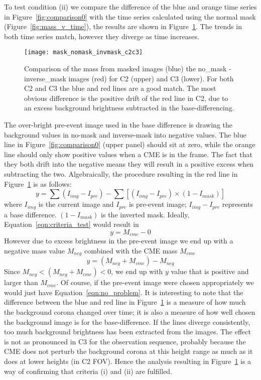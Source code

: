 To test condition (ii) we compare the difference of the blue and orange time series in Figure~\ref{fig:comparison0} with the time series calculated using the normal mask (Figure~\ref{fig:mass_v_time}), the results are shown in Figure~\ref{fig:comparison}. The trends in both time series match, however they diverge as time increases. 
\begin{figure}[t!]
\begin{center}
\texttt{[image: mask\_nomask\_invmask\_c2c3]}
\caption[Mass time series error check]{Comparison of the mass from masked images (blue) the no\_mask - inverse\_mask images (red) for C2 (upper) and C3 (lower). For both C2 and C3 the blue and red lines are a good match. The most obvious difference is the positive drift of the red line in C2, due to an excess background brightness subtracted in the base-differencing.}
\label{fig:comparison}
\end{center}
\end{figure}
The over-bright pre-event image used in the base difference is drawing the background values in no-mask and inverse-mask into negative values. The blue line in Figure~\ref{fig:comparison0} (upper panel) should sit at zero, while the orange line should only show positive values when a CME is in the frame. The fact that they both drift into the negative means they will result in a positive excess when subtracting the two.
Algebraically, the procedure resulting in the red line in Figure~\ref{fig:comparison} is as follows:
\begin{equation}
y = \sum(I_{img} - I_{pre}) - \sum[(I_{img} - I_{pre})\times (1-I_{mask})]
\label{eqn:criteria_test}
\end{equation}
where $I_{img}$ is the current image and $I_{pre}$ is pre-event image; $I_{img} - I_{pre}$ represents a base difference. $(1-I_{mask})$ is the inverted mask. Ideally, Equation~\ref{eqn:criteria_test} would result in
\begin{equation}
y = M_{cme} - 0
\label{eqn:no_problem}
\end{equation}
However due to excess brightness in the pre-event image we end up with a negative mass value $M_{neg}$ combined with the CME mass $M_{cme}$
\begin{equation}
y = (M_{neg} + M_{cme})  - M_{neg}
\end{equation}
Since $M_{neg} < (M_{neg} + M_{cme}   ) < 0$, we end up with $y$ value that is positive and larger than $M_{cme}$. Of course, if the pre-event image were chosen appropriately we would just have Equation~\ref{eqn:no_problem}. It is interesting to note that the difference between the blue and red line in Figure~\ref{fig:comparison} is a measure of how much the background corona changed over time; it is also a measure of how well chosen the background image is for the base-difference. If the lines diverge consistently, too much background brightness has been extracted from the images. The effect is not as pronounced in C3 for the observation sequence, probably because the CME does not perturb the background corona at this height range as much as it does at lower heights (in C2 FOV). Hence the analysis resulting in Figure~\ref{fig:comparison} is a way of confirming that criteria (i) and (ii) are fulfilled.

